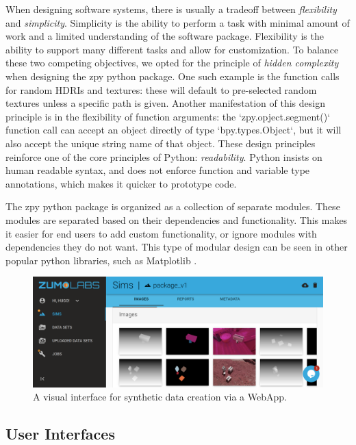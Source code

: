 \documentclass{article}
\begin{document}
When designing software systems, there is usually a tradeoff between \emph{flexibility} and \emph{simplicity}. Simplicity is the ability to perform a task with minimal amount of work and a limited understanding of the software package. Flexibility is the ability to support many different tasks and allow for customization. To balance these two competing objectives, we opted for the principle of \emph{hidden complexity} when designing the zpy python package. One such example is the function calls for random HDRIs and textures: these will default to pre-selected random textures unless a specific path is given. Another manifestation of this design principle is in the flexibility of function arguments: the `zpy.opject.segment()` function call can accept an object directly of type `bpy.types.Object`, but it will also accept the unique string name of that object. These design principles reinforce one of the core principles of Python: \emph{readability}. Python insists on human readable syntax, and does not enforce function and variable type annotations, which makes it quicker to prototype code.


The zpy python package is organized as a collection of separate modules. These modules are separated based on their dependencies and functionality. This makes it easier for end users to add custom functionality, or ignore modules with dependencies they do not want. This type of modular design can be seen in other popular python libraries, such as Matplotlib \cite{Hunter:2007}.

\begin{figure}
	\centering
	\includegraphics[width=\textwidth]{webapp.png}
	\caption{A visual interface for synthetic data creation via a WebApp.}
	\label{fig:webapp}
\end{figure}

\subsection{User Interfaces}
\label{sec:userinterfaces}
\end{document}
